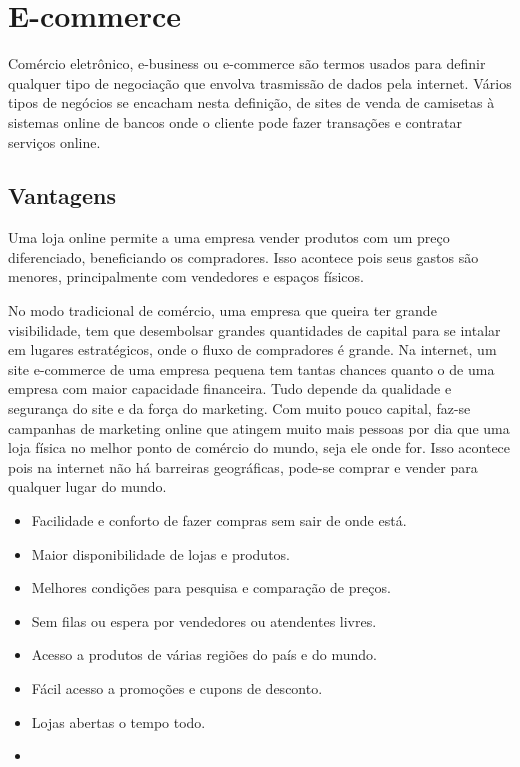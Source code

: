 \documentclass[
	12pt,				%
    oneside,			%
	a4paper,			%
	english,			%
	french,				%
	spanish,			%
	brazil				%
	]{abntex2}
\begin{document}
\section{E-commerce}

Comércio eletrônico, e-business ou e-commerce são termos usados para definir qualquer tipo de negociação que envolva trasmissão de dados pela internet\cite{WhatIsEcommerce}. Vários tipos de negócios se encacham nesta definição, de sites de venda de camisetas à sistemas online de bancos onde o cliente pode fazer transações e contratar serviços online.

\subsection{Vantagens}

Uma loja online permite a uma empresa vender produtos com um preço diferenciado, beneficiando os compradores. Isso acontece pois seus gastos são menores, principalmente com vendedores e espaços físicos.

No modo tradicional de comércio, uma empresa que queira ter grande visibilidade, tem que desembolsar grandes quantidades de capital para se intalar em lugares estratégicos, onde o fluxo de compradores é grande. Na internet, um site e-commerce de uma empresa pequena tem tantas chances quanto o de uma empresa com maior capacidade financeira. Tudo depende da qualidade e segurança do site e da força do marketing. Com muito pouco capital, faz-se campanhas de marketing online que atingem muito mais pessoas por dia que uma loja física no melhor ponto de comércio do mundo, seja ele onde for. Isso acontece pois na internet não há barreiras geográficas, pode-se comprar e vender para qualquer lugar do mundo.

\begin{itemize}
  \item Facilidade e conforto de fazer compras sem sair de onde está.
  \item Maior disponibilidade de lojas e produtos.
  \item Melhores condições para pesquisa e comparação de preços.
  \item Sem filas ou espera por vendedores ou atendentes livres.
  \item Acesso a produtos de várias regiões do país e do mundo.
  \item Fácil acesso a promoções e cupons de desconto.
  \item Lojas abertas o tempo todo.
  \item 
\end{itemize}
\end{document}
